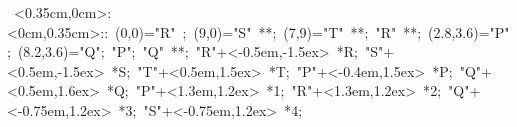 %

\hbox{
\xy    <0.35cm,0cm>:<0cm,0.35cm>::
       (0,0)="R" ; (9,0)="S" **\dir{-}; 
       (7,9)="T" **\dir{-};  "R" **\dir{-};
       (2.8,3.6)="P"; (8.2,3.6)="Q";     
       "P"; "Q" **\dir{-};
       "R"+<-0.5em,-1.5ex> *{R};
       "S"+<0.5em,-1.5ex> *{S};
       "T"+<0.5em,1.5ex> *{T};
       "P"+<-0.4em,1.5ex> *{P};
       "Q"+<0.5em,1.6ex> *{Q};
       "P"+<1.3em,1.2ex> *{1};
       "R"+<1.3em,1.2ex> *{2};
       "Q"+<-0.75em,1.2ex> *{3};
       "S"+<-0.75em,1.2ex> *{4};
       \endxy}
	   
